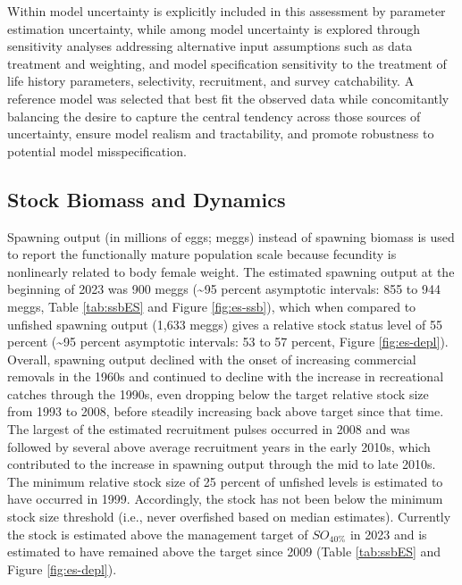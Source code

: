 \documentclass[11pt,
  english,
  letterpaper,
]{article}
\begin{document}
Within model uncertainty is explicitly included in this assessment by parameter estimation uncertainty, while among model uncertainty is explored through sensitivity analyses addressing alternative input assumptions such as data treatment and weighting, and model specification sensitivity to the treatment of life history parameters, selectivity, recruitment, and survey catchability. A reference model was selected that best fit the observed data while concomitantly balancing the desire to capture the central tendency across those sources of uncertainty, ensure model realism and tractability, and promote robustness to potential model misspecification.

\hypertarget{stock-biomass-and-dynamics}{%
\subsection*{Stock Biomass and Dynamics}\label{stock-biomass-and-dynamics}}

Spawning output (in millions of eggs; meggs) instead of spawning biomass is used to report the functionally mature population scale because fecundity is nonlinearly related to body female weight. The estimated spawning output at the beginning of 2023 was 900 meggs (\textasciitilde95 percent asymptotic intervals: 855 to 944 meggs, Table \ref{tab:ssbES} and Figure \ref{fig:es-ssb}), which when compared to unfished spawning output (1,633 meggs) gives a relative stock status level of 55 percent (\textasciitilde95 percent asymptotic intervals: 53 to 57 percent, Figure \ref{fig:es-depl}). Overall, spawning output declined with the onset of increasing commercial removals in the 1960s and continued to decline with the increase in recreational catches through the 1990s, even dropping below the target relative stock size from 1993 to 2008, before steadily increasing back above target since that time. The largest of the estimated recruitment pulses occurred in 2008 and was followed by several above average recruitment years in the early 2010s, which contributed to the increase in spawning output through the mid to late 2010s. The minimum relative stock size of 25 percent of unfished levels is estimated to have occurred in 1999. Accordingly, the stock has not been below the minimum stock size threshold (i.e., never overfished based on median estimates). Currently the stock is estimated above the management target of \(SO_{40\%}\) in 2023 and is estimated to have remained above the target since 2009 (Table \ref{tab:ssbES} and Figure \ref{fig:es-depl}).
\end{document}
